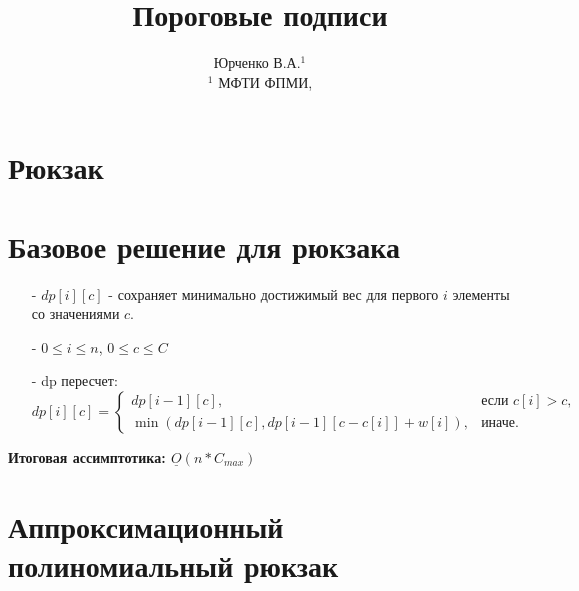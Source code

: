 \documentclass[a4paper,12pt]{extarticle}
\title{Пороговые подписи}
\author{ Юрченко В.А.$^{1}$\\
	$^{1}$ МФТИ ФПМИ,	\\	
}
\begin{document}
\section*{Рюкзак}


\section*{Базовое решение для рюкзака}

\begin{itemize}
	\item[-] $dp[i][c]$ - сохраняет минимально достижимый вес для первого $i$ элементы со значениями $c$.
	\item[-] $0 \leq i \leq n$, $0 \leq c \leq C$ 
	\item[-] dp пересчет: \\
	\[
	dp[i][c] =
	\begin{cases} 
	dp[i-1][c], & \text{если } c[i] > c, \\
	\min\left(dp[i-1][c], dp[i-1][c - c[i]] + w[i]\right), & \text{иначе}.
	\end{cases}
	\]

\end{itemize}

\textbf{Итоговая ассимптотика: $\underline{O}(n * C_{max})$}

\section*{Аппроксимационный полиномиальный рюкзак}
\end{document}
